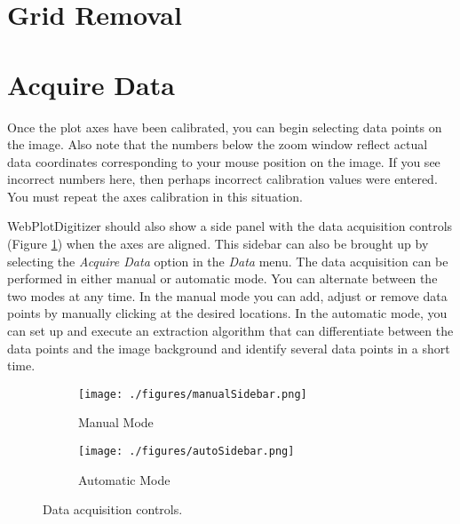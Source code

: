 \documentclass[letterpaper, 10pt]{article}
\begin{document}
\section{Grid Removal}

\section{Acquire Data}

Once the plot axes have been calibrated, you can begin selecting data points on the image. Also note that the numbers below the zoom window reflect actual data coordinates corresponding to your mouse position on the image. If you see incorrect numbers here, then perhaps incorrect calibration values were entered. You must repeat the axes calibration in this situation. 

WebPlotDigitizer should also show a side panel with the data acquisition controls (Figure \ref{fig:acquireData}) when the axes are aligned. This sidebar can also be brought up by selecting the \emph{Acquire Data} option in the \emph{Data} menu. The data acquisition can be performed in either manual or automatic mode. You can alternate between the two modes at any time. In the manual mode you can add, adjust or remove data points by manually clicking at the desired locations. In the automatic mode, you can set up and execute an extraction algorithm that can differentiate between the data points and the image background and identify several data points in a short time.

\begin{figure}
\centering
{
\begin{subfigure}{0.3\textwidth}
\texttt{[image: ./figures/manualSidebar.png]}
\caption{Manual Mode}
\end{subfigure}
\begin{subfigure}{0.3\textwidth}
\texttt{[image: ./figures/autoSidebar.png]}
\caption{Automatic Mode}
\end{subfigure}
}
\caption{Data acquisition controls.}
\label{fig:acquireData}
\end{figure}
\end{document}
